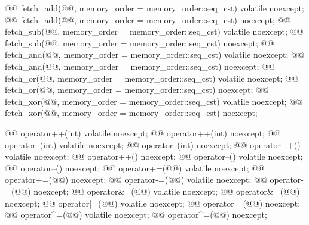 \begin{codeblock}
{{    @@ fetch_add(@@,
                            memory_order = memory_order::seq_cst) volatile noexcept;
    @@ fetch_add(@@,
                            memory_order = memory_order::seq_cst) noexcept;
    @@ fetch_sub(@@,
                            memory_order = memory_order::seq_cst) volatile noexcept;
    @@ fetch_sub(@@,
                            memory_order = memory_order::seq_cst) noexcept;
    @@ fetch_and(@@,
                            memory_order = memory_order::seq_cst) volatile noexcept;
    @@ fetch_and(@@,
                            memory_order = memory_order::seq_cst) noexcept;
    @@ fetch_or(@@,
                            memory_order = memory_order::seq_cst) volatile noexcept;
    @@ fetch_or(@@,
                            memory_order = memory_order::seq_cst) noexcept;
    @@ fetch_xor(@@,
                            memory_order = memory_order::seq_cst) volatile noexcept;
    @@ fetch_xor(@@,
                            memory_order = memory_order::seq_cst) noexcept;

    @@ operator++(int) volatile noexcept;
    @@ operator++(int) noexcept;
    @@ operator--(int) volatile noexcept;
    @@ operator--(int) noexcept;
    @@ operator++() volatile noexcept;
    @@ operator++() noexcept;
    @@ operator--() volatile noexcept;
    @@ operator--() noexcept;
    @@ operator+=(@@) volatile noexcept;
    @@ operator+=(@@) noexcept;
    @@ operator-=(@@) volatile noexcept;
    @@ operator-=(@@) noexcept;
    @@ operator&=(@@) volatile noexcept;
    @@ operator&=(@@) noexcept;
    @@ operator|=(@@) volatile noexcept;
    @@ operator|=(@@) noexcept;
    @@ operator^=(@@) volatile noexcept;
    @@ operator^=(@@) noexcept;

}}
\end{codeblock}
